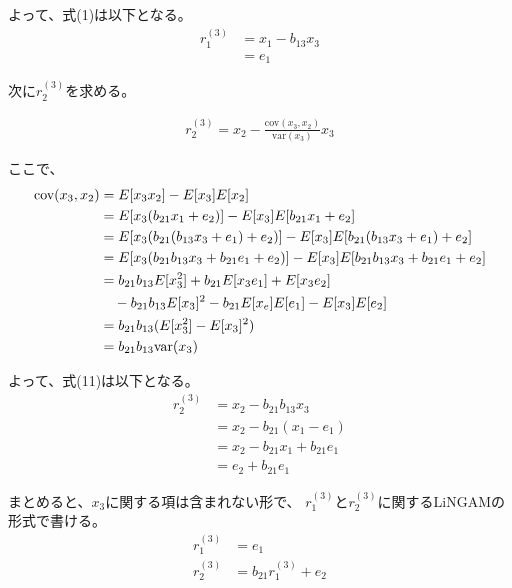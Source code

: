 \documentclass[uplatex]{jsarticle}
\theoremstyle{definition}
\begin{document}
よって、式(1)は以下となる。
\begin{align}
  r_1^{(3)} &= x_1 - b_{13} x_3 \\
            &= e_1
\end{align}

次に$r_2^{(3)}$を求める。

\begin{align}
  r_2^{(3)} = x_2 - \frac{\text{cov}(x_3, x_2)}{\text{var}(x_3)} x_3
\end{align}

ここで、
\begin{align}
  \text{cov}(x_3, x_2) &= E[x_3 x_2] - E[x_3]E[x_2] \\
                       &= E[x_3 (b_{21}x_1 + e_2)] - E[x_3]E[b_{21}x_1 + e_2] \\
                       &= E[x_3 (b_{21}(b_{13} x_3 + e_1) + e_2)] - E[x_3]E[b_{21}(b_{13} x_3 + e_1) + e_2] \\
                       &= E[x_3 (b_{21}b_{13} x_3 + b_{21}e_1 + e_2)] - E[x_3]E[b_{21}b_{13} x_3 + b_{21}e_1 + e_2] \\
                       &= b_{21}b_{13} E[x_3^2] + b_{21} E[x_3 e_1] + E[x_3 e_2] \notag \\
                       & \quad - b_{21}b_{13} E[x_3]^2 - b_{21}E[x_e]E[e_1] - E[x_3]E[e_2] \\
                       &= b_{21}b_{13} (E[x_3^2] - E[x_3]^2) \\
                       &= b_{21}b_{13}\text{var}(x_3)
\end{align}

よって、式(11)は以下となる。
\begin{align}
  r_2^{(3)} &= x_2 - b_{21}b_{13} x_3 \\
            &= x_2 - b_{21}(x_1 - e_1) \\
            &= x_2 - b_{21}x_1 + b_{21} e_1 \\
            &= e_2 + b_{21}e_1
\end{align}

まとめると、$x_3$に関する項は含まれない形で、
$r_1^{(3)}$と$r_2^{(3)}$に関するLiNGAMの形式で書ける。
\begin{align}
  r_1^{(3)} &= e_1 \\
  r_2^{(3)} &= b_{21}r_1^{(3)} + e_2
\end{align}
\end{document}
